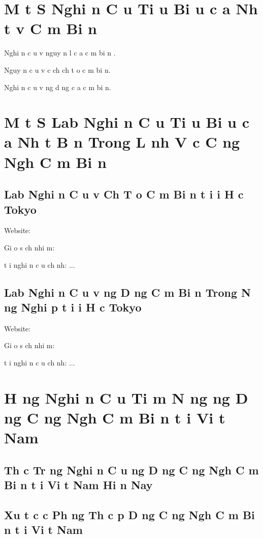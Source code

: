 \documentclass{article}
\begin{document}
\section{M t S  Nghi n C u Ti u Bi u c a Nh t v  C m Bi n}

Nghi n c u v  nguy n l  c a c m bi n \cite{ref3}.

Nguy n c u v  c ch ch  t o c m bi n.

Nghi n c u v   ng d ng c a c m bi n.

\section{M t S  Lab Nghi n C u Ti u Bi u c a Nh t B n Trong L nh V c C ng Ngh  C m Bi n}
\subsection{Lab Nghi n C u v  Ch  T o C m Bi n t i  i H c Tokyo}

Website: 

Gi o s  ch  nhi m: 

  t i nghi n c u ch nh: ...

\subsection{Lab Nghi n C u v   ng D ng C m Bi n Trong N ng Nghi p t i  i H c Tokyo}

Website: 

Gi o s  ch  nhi m: 

  t i nghi n c u ch nh: ...

\section{H ng Nghi n C u Ti m N ng  ng D ng C ng Ngh  C m Bi n t i Vi t Nam}
\subsection{Th c Tr ng Nghi n C u  ng D ng C ng Ngh  C m Bi n t i Vi t Nam Hi n Nay}
\lipsum[1-2]

\subsection{  Xu t c c Ph ng Th c  p D ng C ng Ngh  C m Bi n t i Vi t Nam}
\lipsum[3-4]
\end{document}
